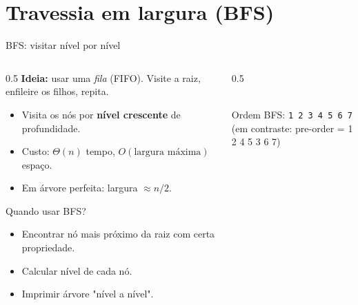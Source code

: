 \documentclass[aspectratio=169]{beamer}
\begin{document}
\section{Travessia em largura (BFS)}

\begin{frame}[shrink=18]{BFS: visitar nível por nível}
\begin{columns}[T]
\begin{column}{0.5\textwidth}
\textbf{Ideia:} usar uma \emph{fila} (FIFO). Visite a raiz, enfileire os filhos, repita.
\begin{itemize}
  \item Visita os nós por \textbf{nível crescente} de profundidade.
  \item Custo: $\Theta(n)$ tempo, $O(\text{largura máxima})$ espaço.
  \item Em árvore perfeita: largura $\approx n/2$.
\end{itemize}
\begin{block}{Quando usar BFS?}
\begin{itemize}\small
  \item Encontrar nó mais próximo da raiz com certa propriedade.
  \item Calcular nível de cada nó.
  \item Imprimir árvore "nível a nível".
\end{itemize}
\end{block}
\end{column}
\begin{column}{0.5\textwidth}
\centering
{}\\[4pt]
\small Ordem BFS: \texttt{1 2 3 4 5 6 7}\\
(em contraste: pre-order = 1 2 4 5 3 6 7)
\end{column}
\end{columns}
\end{frame}
\end{document}

